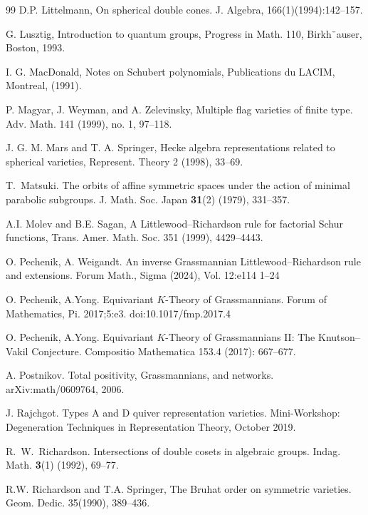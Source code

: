 \documentclass[12pt,reqno]{amsart}
\numberwithin{equation}{section}
\theoremstyle{definition}
\begin{document}
\begin{thebibliography}{99}
D.P. Littelmann, On spherical double cones. J. Algebra, 166(1)(1994):142–157.

G. Lusztig, Introduction to quantum groups, Progress in Math. 110, Birkh¨auser,
Boston, 1993.


I. G. MacDonald, Notes on Schubert polynomials, Publications du LACIM, Montreal, (1991). 

P. Magyar, J. Weyman, and A. Zelevinsky, Multiple flag varieties of finite type. Adv. Math. 141 (1999), no. 1, 97–118.

J. G. M. Mars and T. A. Springer, Hecke algebra representations related to spherical varieties, Represent. Theory 2 (1998), 33–69.

T.~Matsuki.
\newblock The orbits of affine symmetric spaces under the action of minimal parabolic subgroups.
\newblock J. Math. Soc. Japan \textbf{31}(2) (1979), 331--357.



A.I. Molev and B.E. Sagan, A Littlewood--Richardson rule for factorial Schur
functions, Trans. Amer. Math. Soc. 351 (1999), 4429--4443.


O. Pechenik, A. Weigandt.
An inverse Grassmannian Littlewood--Richardson rule and extensions. Forum  Math., Sigma (2024), Vol. 12:e114 1–24

O. Pechenik, A.Yong. Equivariant $K$-Theory of Grassmannians. Forum of Mathematics, Pi. 2017;5:e3. doi:10.1017/fmp.2017.4

O. Pechenik, A.Yong. Equivariant $K$-Theory of Grassmannians II: The Knutson–Vakil Conjecture. Compositio Mathematica 153.4 (2017): 667–677.



A. Postnikov. Total positivity, Grassmannians, and networks. arXiv:math/0609764,  2006. 

J. Rajchgot. Types A and D quiver representation varieties. Mini-Workshop: Degeneration Techniques in Representation Theory, October 2019. 


R.~W.~Richardson.
\newblock Intersections of double cosets in algebraic groups.
\newblock Indag. Math. \textbf{3}(1) (1992), 69--77.

R.W. Richardson and T.A. Springer,  The Bruhat order on symmetric varieties. Geom. Dedic. 35(1990), 389–436.




\end{thebibliography}
\end{document}
